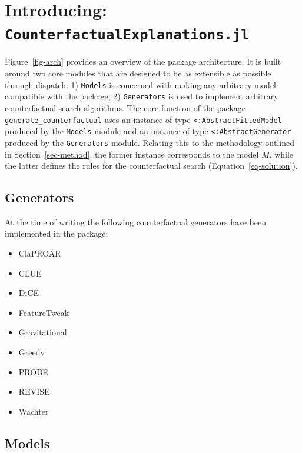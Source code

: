 \documentclass[
  letterpaper,
  DIV=11,
  numbers=noendperiod]{scrartcl}
\begin{document}
\hypertarget{sec-arch}{%
\section{\texorpdfstring{Introducing:
\texttt{CounterfactualExplanations.jl}}{Introducing: CounterfactualExplanations.jl}}\label{sec-arch}}

Figure~\ref{fig-arch} provides an overview of the package architecture.
It is built around two core modules that are designed to be as
extensible as possible through dispatch: 1) \texttt{Models} is concerned
with making any arbitrary model compatible with the package; 2)
\texttt{Generators} is used to implement arbitrary counterfactual search
algorithms. The core function of the package
\texttt{generate\_counterfactual} uses an instance of type
\texttt{\textless{}:AbstractFittedModel} produced by the \texttt{Models}
module and an instance of type \texttt{\textless{}:AbstractGenerator}
produced by the \texttt{Generators} module. Relating this to the
methodology outlined in Section~\ref{sec-method}, the former instance
corresponds to the model \(M\), while the latter defines the rules for
the counterfactual search (Equation~\ref{eq-solution}).

\hypertarget{generators}{%
\subsection{Generators}\label{generators}}

At the time of writing the following counterfactual generators have been
implemented in the package:

\begin{itemize}
\item ClaPROAR \cite{altmeyer2023endogenous}
\item CLUE \cite{antoran2020getting}
\item DiCE \cite{mothilal2020explaining}
\item FeatureTweak \cite{tolomei2017interpretable}
\item Gravitational \cite{altmeyer2023endogenous}
\item Greedy \cite{schut2021generating}
\item PROBE \cite{pawelczyk2022probabilistically}
\item REVISE \cite{joshi2019realistic}
\item Wachter \cite{wachter2017counterfactual}
\end{itemize}

\hypertarget{models}{%
\subsection{Models}\label{models}}
\end{document}
